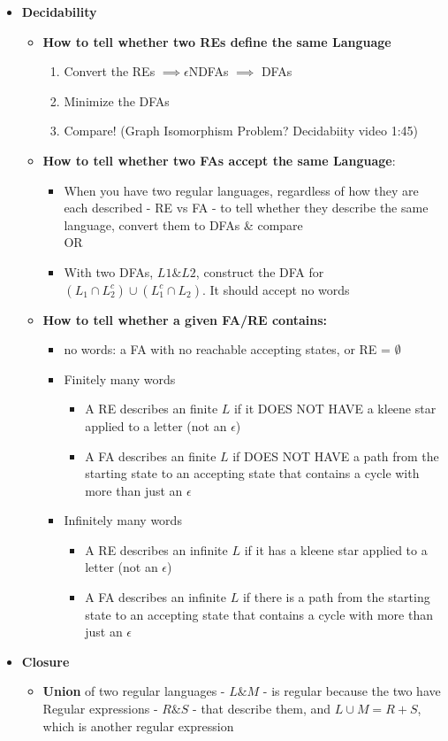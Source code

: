 
\begin{itemize}
\item \textbf{Decidability}
	\begin{itemize}
		\item \textbf{How to tell whether two REs define the same Language}
			\begin{enumerate}
				\item Convert the REs $\implies \epsilon$NDFAs $\implies$ DFAs
				\item Minimize the DFAs
				\item Compare! (Graph Isomorphism Problem?  Decidabiity video 1:45)
			\end{enumerate}
		\item \textbf{How to tell whether two FAs accept the same Language}:
		\begin{itemize}
			\item When you have two regular languages, regardless of how they are each described - RE vs FA - to tell whether they describe the same language, convert them to DFAs \& compare
			\\OR
			\item With two DFAs, $L1 \& L2$, construct the DFA for $(L_1 \cap L_2^c) \cup (L_1^c \cap L_2)$.  It should accept no words
		\end{itemize}
		\item \textbf{How to tell whether a given FA/RE contains:}
		\begin{itemize}
			\item no words: a FA with no reachable accepting states, or RE = $\emptyset$
			\item Finitely many words
			\begin{itemize}
				\item A RE describes an finite $L$ if it DOES NOT HAVE a kleene star applied to a letter (not an $\epsilon$)
				\item A FA describes an finite $L$ if DOES NOT HAVE a path from the starting state to an accepting state that contains a cycle with more than just an $\epsilon$
			\end{itemize}
			\item Infinitely many words
				\begin{itemize}
					\item A RE describes an infinite $L$ if it has a kleene star applied to a letter (not an $\epsilon$)
					\item A FA describes an infinite $L$ if there is a path from the starting state to an accepting state that contains a cycle with more than just an $\epsilon$
				\end{itemize}
		\end{itemize}
	\end{itemize}
\item \textbf{Closure}
\begin{itemize}
\item \textbf{Union} of two regular languages - $L \& M$ - is regular
  because  the two have Regular expressions - $R \& S$ - that describe
  them, and $L \cup M = R + S$, which is another regular expression


\end{itemize}
\end{itemize}
